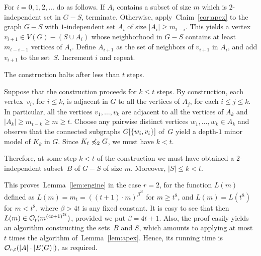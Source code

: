 For $i=0,1,2,\ldots$ do as follows.  If $A_{i}$ contains a subset of
size $m$ which is $2$-independent set in $G-S$, terminate.  Otherwise,
apply~Claim~\ref{cor:apex} to the graph $G-S$ with $1$-independent set
$A_{i}$ of size $|A_i|\ge m_{t-i}$. This yields a vertex
$v_{i+1}\in V(G)-(S\cup A_i)$ whose neighborhood in $G-S$ contains at
least $m_{t-i-1}$ vertices of $A_{i}$.  Define $A_{i+1}$ as the set of
neighbors of $v_{i+1}$ in $A_i$, and add $v_{i+1}$ to the set~$S$.
Increment $i$ and repeat.

\begin{claim}\label{claim:at-most-t}
  The construction halts after less than $t$ steps.
\end{claim}
\begin{clproof}
  Suppose that the construction proceeds for $k\le t$ steps.  By
  construction, each vertex~$v_i$, for $i\le k$, is adjacent in $G$ to
  all the vertices of $A_{j}$, for each $i\le j\le k$. In particular,
  all the vertices $v_1,\ldots,v_k$ are adjacent to all the vertices
  of $A_{k}$ and $|A_k|\ge m_{t-k}\ge m\ge t$.  Choose any pairwise
  distinct vertices $w_1,\ldots,w_k\in A_k$ and observe that the
  connected subgraphs $G[\{w_i,v_i\}]$ of~$G$ yield a depth-$1$
  minor model of $K_k$ in $G$.  Since $K_t\not\preccurlyeq_2 G$, we must
  have $k<t$.
 \end{clproof}
 
 Therefore, at some step $k<t$ of the construction we must have
 obtained a $2$-independent subset~$B$ of $G-S$ of size $m$. Moreover,
 $|S|\le k<t$.
 
 
 
 This proves~Lemma~\ref{lem:engine} in the case $r=2$, for the
 function $L(m)$ defined as $L(m)=m_t=((t+1)\cdot m)^{\beta^{2t}}$ for
 $m\ge t^8$, and $L(m)=L(t^8)$ for $m<t^8$, where $\beta>4t$ is any
 fixed constant.  It is easy to see that then
 $L(m)\in \mathcal{O}_{t}{(m^{{(4t+1)}^{2t}})}$, provided we put
 $\beta=4t+1$.  Also, the proof easily yields an algorithm
 constructing the sets~$B$ and $S$, which amounts to applying at most
 $t$ times the algorithm of~Lemma~\ref{lem:apex}.  Hence, its running
 time is $\mathcal{O}_{r,t}(|A|\cdot |E(G)|)$, as required.



